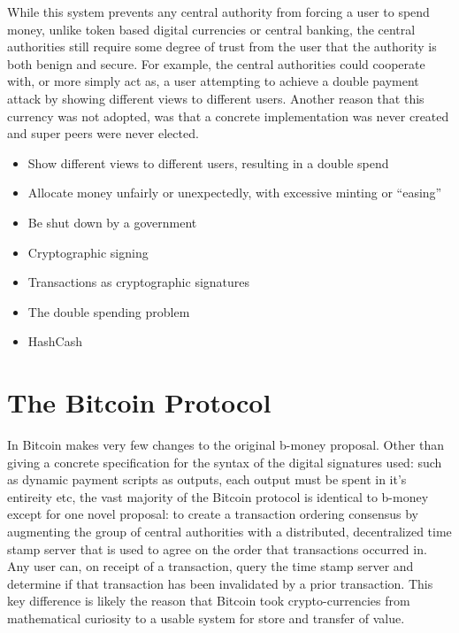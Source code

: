 While this system prevents any central authority from forcing a user to spend money, unlike token based digital currencies or central banking, the central authorities still require some degree of trust from the user that the authority is both benign and secure. For example, the central authorities could cooperate with, or more simply act as, a user attempting to achieve a double payment attack by showing different views to different users. Another reason that this currency was not adopted, was that a concrete implementation was never created and super peers were never elected.

\begin{itemize} \item Show different views to different users, resulting in a
        double spend \item Allocate money unfairly or unexpectedly, with
        excessive minting or ``easing'' \item Be shut down by a government \item
        Cryptographic signing \item Transactions as cryptographic signatures
        \item The double spending problem \item HashCash \end{itemize}

\section{The Bitcoin Protocol}
In Bitcoin \textcite{satoshi} makes very few changes to the original b-money\cite{b-money} proposal. Other than giving a concrete specification for the syntax of the digital signatures  used: such as dynamic payment scripts as outputs, each output must be spent in it's entireity etc, the vast majority of the Bitcoin protocol is identical to b-money except for one novel proposal: to create a transaction ordering consensus by augmenting the group of central authorities with a distributed, decentralized time stamp server that is used to agree on the order that transactions occurred in.  Any user can, on receipt of a transaction, query the time stamp server and determine if that transaction has been invalidated by a prior transaction. This key difference is likely the reason that Bitcoin took crypto-currencies from mathematical curiosity to a usable system for store and transfer of value.

